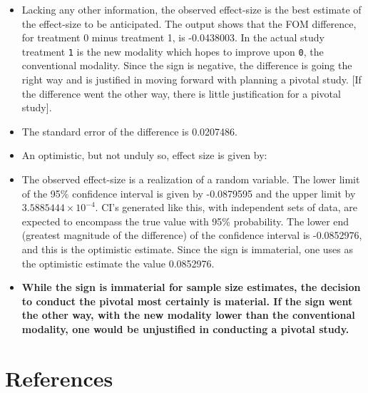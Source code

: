 \documentclass[]{book}
\newenvironment{Shaded}{\begin{snugshade}}{\end{snugshade}}
\newcommand{\DecValTok}[1]{\textcolor[rgb]{0.00,0.00,0.81}{#1}}
\newcommand{\KeywordTok}[1]{\textcolor[rgb]{0.13,0.29,0.53}{\textbf{#1}}}
\newcommand{\NormalTok}[1]{#1}
\newcommand{\OperatorTok}[1]{\textcolor[rgb]{0.81,0.36,0.00}{\textbf{#1}}}
\newcommand{\StringTok}[1]{\textcolor[rgb]{0.31,0.60,0.02}{#1}}
\begin{document}
\begin{itemize}
\item
  Lacking any other information, the observed effect-size is the best estimate of the effect-size to be anticipated. The output shows that the FOM difference, for treatment 0 minus treatment 1, is -0.0438003. In the actual study treatment \texttt{1} is the new modality which hopes to improve upon \texttt{0}, the conventional modality. Since the sign is negative, the difference is going the right way and is justified in moving forward with planning a pivotal study. {[}If the difference went the other way, there is little justification for a pivotal study{]}.
\item
  The standard error of the difference is 0.0207486.
\item
  An optimistic, but not unduly so, effect size is given by:
\end{itemize}

\begin{Shaded}
\end{Shaded}

\begin{itemize}
\item
  The observed effect-size is a realization of a random variable. The lower limit of the 95\% confidence interval is given by -0.0879595 and the upper limit by \ensuremath{3.5885444\times 10^{-4}}. CI's generated like this, with independent sets of data, are expected to encompass the true value with 95\% probability. The lower end (greatest magnitude of the difference) of the confidence interval is -0.0852976, and this is the optimistic estimate. Since the sign is immaterial, one uses as the optimistic estimate the value 0.0852976.
\item
  \textbf{While the sign is immaterial for sample size estimates, the decision to conduct the pivotal most certainly is material. If the sign went the other way, with the new modality lower than the conventional modality, one would be unjustified in conducting a pivotal study.}
\end{itemize}

\hypertarget{references-8}{%
\section{References}\label{references-8}}
\end{document}

